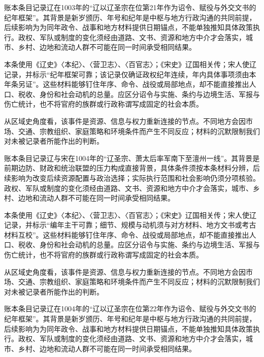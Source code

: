 账本条目记录辽在1003年的“辽以辽圣宗在位第21年作为诏令、赋役与外交文书的纪年框架”。其背景是新岁颁历、年号和纪年是中枢与地方行政沟通的共同前提，后续影响为为同年政令、战事和地方材料提供日期锚点，不能单独推知具体政策执行。政权、军队或制度的变化须经由道路、文书、资源和地方中介才会落实，城市、乡村、边地和流动人群不可能在同一时间承受相同结果。

本条使用《辽史》〈本纪〉、〈营卫志〉、〈百官志〉；《宋史》辽国相关传；宋人使辽记录，并标示“纪年框架可靠；该记录仅确证政权纪年连续，年内具体事项须由本年条另证”。这些材料能够钉住年序、命令、战役或局部地点，却不能直接推出人口、税收、身份和社会动机的总量。应区分诏令与实施、条约与边境生活、军报与伤亡统计，也不将官府的族群或行政称谓写成固定的社会本质。

从区域史角度看，该事件是资源、信息与权力重新连接的节点。不同地方会因市场、交通、宗教组织、家庭策略和环境条件而产生不同反应；材料的沉默限制我们对未被记录者所能作出的判断。

账本条目记录辽与宋在1004年的“辽圣宗、萧太后率军南下至澶州一线”。其背景是前期边防、财政和统治联盟的压力构成直接背景，具体条件须按本条材料分辨，后续影响为改变后续资源配置与政治选择；实际执行范围和社会影响仍须分项核验。政权、军队或制度的变化须经由道路、文书、资源和地方中介才会落实，城市、乡村、边地和流动人群不可能在同一时间承受相同结果。

本条使用《辽史》〈本纪〉、〈营卫志〉、〈百官志〉；《宋史》辽国相关传；宋人使辽记录，并标示“编年主干可靠；细节、规模与动机须与对方材料、地方文书或考古材料互校”。这些材料能够钉住年序、命令、战役或局部地点，却不能直接推出人口、税收、身份和社会动机的总量。应区分诏令与实施、条约与边境生活、军报与伤亡统计，也不将官府的族群或行政称谓写成固定的社会本质。

从区域史角度看，该事件是资源、信息与权力重新连接的节点。不同地方会因市场、交通、宗教组织、家庭策略和环境条件而产生不同反应；材料的沉默限制我们对未被记录者所能作出的判断。

账本条目记录辽在1004年的“辽以辽圣宗在位第22年作为诏令、赋役与外交文书的纪年框架”。其背景是新岁颁历、年号和纪年是中枢与地方行政沟通的共同前提，后续影响为为同年政令、战事和地方材料提供日期锚点，不能单独推知具体政策执行。政权、军队或制度的变化须经由道路、文书、资源和地方中介才会落实，城市、乡村、边地和流动人群不可能在同一时间承受相同结果。

